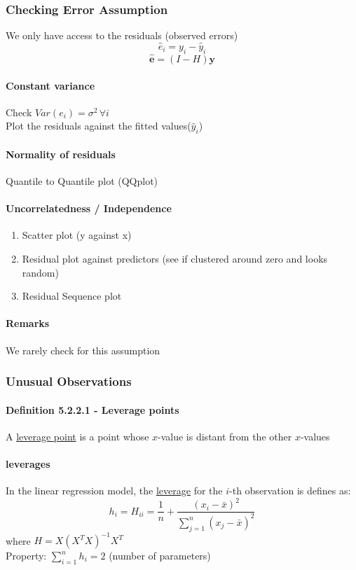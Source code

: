 \documentclass[11pt]{article}
\newcommand{\tb}[1]{\textbf{#1}}
\newcommand{\under}[1]{\underline{#1}}
\newcommand{\vy}[0]{\tb{y}}
\newcommand{\ve}[0]{\tb{e}}
\begin{document}
\subsubsection{Checking Error Assumption}
We only have access to the residuals (observed errors)
$$\hat{e}_i = y_i - \hat{y}_i$$
$$\hat{\ve} = (I - H)\vy$$
\paragraph{Constant variance}
Check $Var(e_i) = \sigma^2 \, \forall i$\\
Plot the residuals against the fitted values($\hat{y}_i$)
\paragraph{Normality of residuals}
Quantile to Quantile plot (QQplot)
\paragraph{Uncorrelatedness / Independence}
\begin{enumerate}
    \item Scatter plot (y against x)
    \item Residual plot against predictors (see if clustered around zero and looks random)
    \item Residual Sequence plot
\end{enumerate}
\paragraph{Remarks}
We rarely check for this assumption

\subsubsection{Unusual Observations}
\paragraph{Definition 5.2.2.1 - Leverage points}
A \under{leverage point} is a point whose $x$-value is distant from the other $x$-values
\paragraph{leverages}
In the linear regression model, the \under{leverage} for the $i$-th observation is defines as:
$$h_i = H_{ii} = \frac{1}{n}+\frac{(x_i-\bar{x})^2}{\sum_{j=1}^n(x_j-\bar{x})^2}$$
where $H = X(X^TX)^{-1}X^T$ \\
Property: $\sum_{i=1}^n h_i = 2$ (number of parameters)
\end{document}
